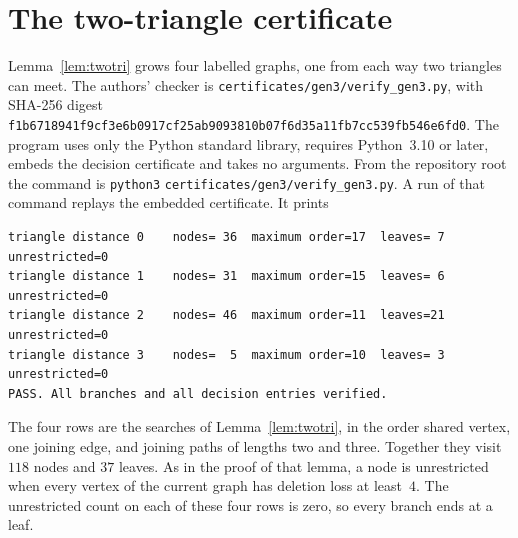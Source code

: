 \documentclass[ASNA]{USG}
\theoremstyle{WBstyletwo}
\numberwithin{equation}{section}
\begin{document}
\appendix

\section{The two-triangle certificate}\label{sec:certificate}

Lemma~\ref{lem:twotri} grows four labelled graphs, one from each way two triangles can meet. The authors' checker is \texttt{certificates/}\allowbreak\texttt{gen3/}\allowbreak\texttt{verify\_gen3.py}, with SHA-256 digest \texttt{f1b67189}\hspace{0.35em}\texttt{41f9cf3e}\hspace{0.35em}\texttt{6b0917cf}\hspace{0.35em}\texttt{25ab9093}\hspace{0.35em}\texttt{810b07f6}\hspace{0.35em}\texttt{d35a11fb}\hspace{0.35em}\texttt{7cc539fb}\hspace{0.35em}\texttt{546e6fd0}. The program uses only the Python standard library, requires Python~3.10 or later, embeds the decision certificate and takes no arguments. From the repository root the command is \texttt{python3} \texttt{certificates/}\allowbreak\texttt{gen3/}\allowbreak\texttt{verify\_gen3.py}. A run of that command replays the embedded certificate. It prints
\begin{verbatim}
triangle distance 0    nodes= 36  maximum order=17  leaves= 7  unrestricted=0
triangle distance 1    nodes= 31  maximum order=15  leaves= 6  unrestricted=0
triangle distance 2    nodes= 46  maximum order=11  leaves=21  unrestricted=0
triangle distance 3    nodes=  5  maximum order=10  leaves= 3  unrestricted=0
PASS. All branches and all decision entries verified.
\end{verbatim}
The four rows are the searches of Lemma~\ref{lem:twotri}, in the order shared vertex, one joining edge, and joining paths of lengths two and three. Together they visit $118$ nodes and $37$ leaves. As in the proof of that lemma, a node is unrestricted when every vertex of the current graph has deletion loss at least~$4$. The unrestricted count on each of these four rows is zero, so every branch ends at a leaf.
\end{document}
